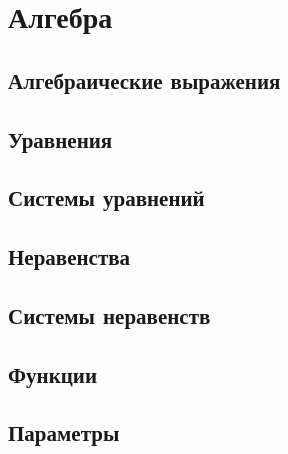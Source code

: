 \part{Алгебра}
\chapter{Алгебраические выражения}
	
\chapter{Уравнения}
	
\chapter{Системы уравнений}
	
\chapter{Неравенства}
\chapter{Системы неравенств}
\chapter{Функции}
	
\chapter{Параметры}

